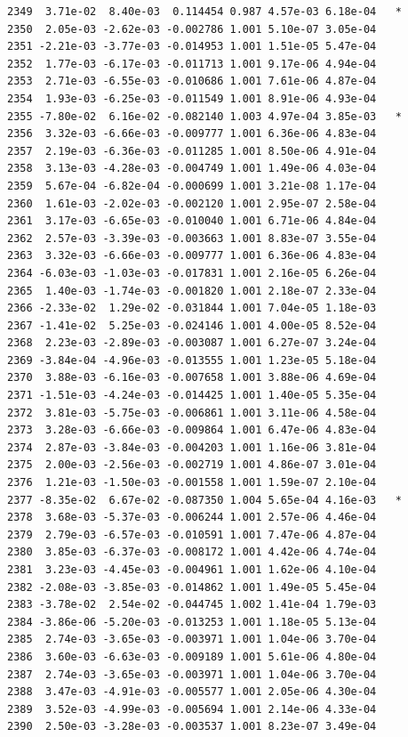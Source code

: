 \documentclass[
  letterpaper,
  DIV=11,
  numbers=noendperiod]{scrartcl}
\begin{document}
\begin{verbatim}
2349  3.71e-02  8.40e-03  0.114454 0.987 4.57e-03 6.18e-04   *
2350  2.05e-03 -2.62e-03 -0.002786 1.001 5.10e-07 3.05e-04    
2351 -2.21e-03 -3.77e-03 -0.014953 1.001 1.51e-05 5.47e-04    
2352  1.77e-03 -6.17e-03 -0.011713 1.001 9.17e-06 4.94e-04    
2353  2.71e-03 -6.55e-03 -0.010686 1.001 7.61e-06 4.87e-04    
2354  1.93e-03 -6.25e-03 -0.011549 1.001 8.91e-06 4.93e-04    
2355 -7.80e-02  6.16e-02 -0.082140 1.003 4.97e-04 3.85e-03   *
2356  3.32e-03 -6.66e-03 -0.009777 1.001 6.36e-06 4.83e-04    
2357  2.19e-03 -6.36e-03 -0.011285 1.001 8.50e-06 4.91e-04    
2358  3.13e-03 -4.28e-03 -0.004749 1.001 1.49e-06 4.03e-04    
2359  5.67e-04 -6.82e-04 -0.000699 1.001 3.21e-08 1.17e-04    
2360  1.61e-03 -2.02e-03 -0.002120 1.001 2.95e-07 2.58e-04    
2361  3.17e-03 -6.65e-03 -0.010040 1.001 6.71e-06 4.84e-04    
2362  2.57e-03 -3.39e-03 -0.003663 1.001 8.83e-07 3.55e-04    
2363  3.32e-03 -6.66e-03 -0.009777 1.001 6.36e-06 4.83e-04    
2364 -6.03e-03 -1.03e-03 -0.017831 1.001 2.16e-05 6.26e-04    
2365  1.40e-03 -1.74e-03 -0.001820 1.001 2.18e-07 2.33e-04    
2366 -2.33e-02  1.29e-02 -0.031844 1.001 7.04e-05 1.18e-03    
2367 -1.41e-02  5.25e-03 -0.024146 1.001 4.00e-05 8.52e-04    
2368  2.23e-03 -2.89e-03 -0.003087 1.001 6.27e-07 3.24e-04    
2369 -3.84e-04 -4.96e-03 -0.013555 1.001 1.23e-05 5.18e-04    
2370  3.88e-03 -6.16e-03 -0.007658 1.001 3.88e-06 4.69e-04    
2371 -1.51e-03 -4.24e-03 -0.014425 1.001 1.40e-05 5.35e-04    
2372  3.81e-03 -5.75e-03 -0.006861 1.001 3.11e-06 4.58e-04    
2373  3.28e-03 -6.66e-03 -0.009864 1.001 6.47e-06 4.83e-04    
2374  2.87e-03 -3.84e-03 -0.004203 1.001 1.16e-06 3.81e-04    
2375  2.00e-03 -2.56e-03 -0.002719 1.001 4.86e-07 3.01e-04    
2376  1.21e-03 -1.50e-03 -0.001558 1.001 1.59e-07 2.10e-04    
2377 -8.35e-02  6.67e-02 -0.087350 1.004 5.65e-04 4.16e-03   *
2378  3.68e-03 -5.37e-03 -0.006244 1.001 2.57e-06 4.46e-04    
2379  2.79e-03 -6.57e-03 -0.010591 1.001 7.47e-06 4.87e-04    
2380  3.85e-03 -6.37e-03 -0.008172 1.001 4.42e-06 4.74e-04    
2381  3.23e-03 -4.45e-03 -0.004961 1.001 1.62e-06 4.10e-04    
2382 -2.08e-03 -3.85e-03 -0.014862 1.001 1.49e-05 5.45e-04    
2383 -3.78e-02  2.54e-02 -0.044745 1.002 1.41e-04 1.79e-03    
2384 -3.86e-06 -5.20e-03 -0.013253 1.001 1.18e-05 5.13e-04    
2385  2.74e-03 -3.65e-03 -0.003971 1.001 1.04e-06 3.70e-04    
2386  3.60e-03 -6.63e-03 -0.009189 1.001 5.61e-06 4.80e-04    
2387  2.74e-03 -3.65e-03 -0.003971 1.001 1.04e-06 3.70e-04    
2388  3.47e-03 -4.91e-03 -0.005577 1.001 2.05e-06 4.30e-04    
2389  3.52e-03 -4.99e-03 -0.005694 1.001 2.14e-06 4.33e-04    
2390  2.50e-03 -3.28e-03 -0.003537 1.001 8.23e-07 3.49e-04    

\end{verbatim}
\end{document}
